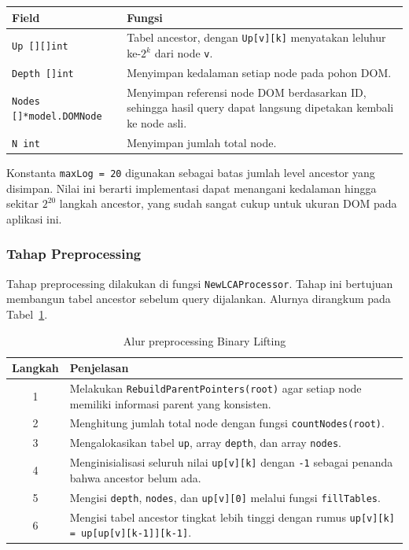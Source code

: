 \begin{center}
\begin{tabular}{|l|p{8.8cm}|}
\hline
\textbf{Field} & \textbf{Fungsi} \\ \hline
\texttt{Up [][]int} & Tabel ancestor, dengan \texttt{Up[v][k]} menyatakan leluhur ke-$2^k$ dari node \texttt{v}. \\ \hline
\texttt{Depth []int} & Menyimpan kedalaman setiap node pada pohon DOM. \\ \hline
\texttt{Nodes []*model.DOMNode} & Menyimpan referensi node DOM berdasarkan ID, sehingga hasil query dapat langsung dipetakan kembali ke node asli. \\ \hline
\texttt{N int} & Menyimpan jumlah total node. \\ \hline
\end{tabular}
\end{center}

Konstanta \texttt{maxLog = 20} digunakan sebagai batas jumlah level ancestor yang
disimpan. Nilai ini berarti implementasi dapat menangani kedalaman hingga sekitar
$2^{20}$ langkah ancestor, yang sudah sangat cukup untuk ukuran DOM pada aplikasi ini.

\subsubsection{Tahap Preprocessing}

Tahap preprocessing dilakukan di fungsi \texttt{NewLCAProcessor}. Tahap ini bertujuan
membangun tabel ancestor sebelum query dijalankan. Alurnya dirangkum pada
Tabel~\ref{tab:alur-preprocess-lca}.

\begin{table}[H]
\centering
\caption{Alur preprocessing Binary Lifting}
\label{tab:alur-preprocess-lca}
\begin{tabular}{|c|p{10cm}|}
\hline
\textbf{Langkah} & \textbf{Penjelasan} \\ \hline
1 & Melakukan \texttt{RebuildParentPointers(root)} agar setiap node memiliki informasi parent yang konsisten. \\ \hline
2 & Menghitung jumlah total node dengan fungsi \texttt{countNodes(root)}. \\ \hline
3 & Mengalokasikan tabel \texttt{up}, array \texttt{depth}, dan array \texttt{nodes}. \\ \hline
4 & Menginisialisasi seluruh nilai \texttt{up[v][k]} dengan \texttt{-1} sebagai penanda bahwa ancestor belum ada. \\ \hline
5 & Mengisi \texttt{depth}, \texttt{nodes}, dan \texttt{up[v][0]} melalui fungsi \texttt{fillTables}. \\ \hline
6 & Mengisi tabel ancestor tingkat lebih tinggi dengan rumus \texttt{up[v][k] = up[up[v][k-1]][k-1]}. \\ \hline
\end{tabular}
\end{table}


